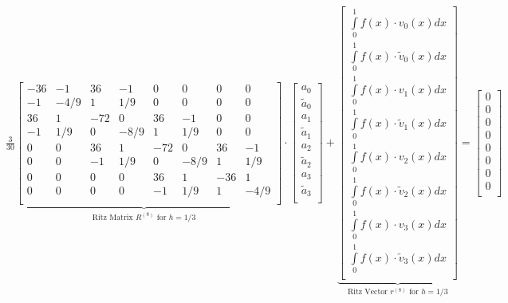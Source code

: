 $\underset{\text{Ritz Matrix $R^{(8)}$ for } h=1/3}{\underbrace{\frac{3}{30}\begin{bmatrix}
	-36 & -1 & 36 & -1 & 0  & 0  & 0  & 0 \\
	-1  & -4/9  & 1  & 1/9  & 0  & 0  & 0  & 0\\
	36  & 1  & -72  & 0  & 36  & -1  & 0  & 0\\
	-1  & 1/9  & 0  & -8/9  & 1  & 1/9  & 0  & 0\\
	0  & 0  & 36  & 1  & -72  & 0  & 36  & -1\\
	0  & 0  & -1  & 1/9  & 0  & -8/9  & 1  & 1/9\\
	0  & 0  & 0  & 0  & 36  & 1  & -36  & 1\\
	0  & 0  & 0  & 0  & -1  & 1/9  & 1  & -4/9\\
\end{bmatrix}}}\cdot\begin{bmatrix}
	a_0\\
	\tilde{a}_0\\
	a_1\\
	\tilde{a}_1\\
	a_2\\
	\tilde{a}_2\\
	a_3\\
	\tilde{a}_3\\
\end{bmatrix}
+\underset{\text{Ritz Vector $r^{(8)}$ for } h=1/3}{\underbrace{\begin{bmatrix}
	\int\limits_{0}^{1}{f(x)\cdot v_0(x)dx}\\
	\int\limits_{0}^{1}{f(x)\cdot \tilde{v}_0(x)dx}\\
	\int\limits_{0}^{1}{f(x)\cdot v_1(x)dx}\\
	\int\limits_{0}^{1}{f(x)\cdot \tilde{v}_1(x)dx}\\
	\int\limits_{0}^{1}{f(x)\cdot v_2(x)dx}\\
	\int\limits_{0}^{1}{f(x)\cdot \tilde{v}_2(x)dx}\\
	\int\limits_{0}^{1}{f(x)\cdot v_3(x)dx}\\
	\int\limits_{0}^{1}{f(x)\cdot \tilde{v}_3(x)dx}\\
\end{bmatrix}}}=
\begin{bmatrix}
	0\\
	0\\
	0\\
	0\\
	0\\
	0\\
	0\\
	0\\
\end{bmatrix}
$\\


